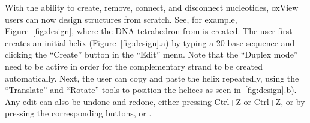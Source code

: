 With the ability to create, remove, connect, and disconnect nucleotides, oxView users can now design structures from scratch. See, for example, Figure~\ref{fig:design}, where the DNA tetrahedron from \cite{goodman2005rapid} is created. The user first creates an initial helix (Figure~\ref{fig:design}.a) by typing a 20-base sequence and clicking the ``Create'' button  in the ``Edit'' menu. Note that the ``Duplex mode'' need to be active in order for the complementary strand to be created automatically. Next, the user can copy  and paste  the helix repeatedly, using the ``Translate''  and ``Rotate''  tools to position the helices as seen in~\ref{fig:design}.b). Any edit can also be undone and redone, either pressing Ctrl+Z or Ctrl+Z, or by pressing the corresponding buttons,  or .


\newcommand{\toolHeight}{1.5em}


